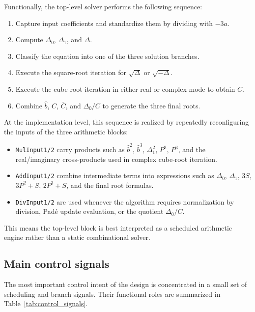 Functionally, the top-level solver performs the following sequence:
\begin{enumerate}
    \item Capture input coefficients and standardize them by dividing with $-3a$.
    \item Compute $\Delta_0$, $\Delta_1$, and $\Delta$.
    \item Classify the equation into one of the three solution branches.
    \item Execute the square-root iteration for $\sqrt{\Delta}$ or $\sqrt{-\Delta}$.
    \item Execute the cube-root iteration in either real or complex mode to obtain $C$.
    \item Combine $\hat{b}$, $C$, $\overline{C}$, and $\Delta_0/C$ to generate the three final roots.
\end{enumerate}

At the implementation level, this sequence is realized by repeatedly reconfiguring the inputs of the three arithmetic blocks:
\begin{itemize}[noitemsep]
    \item \texttt{MulInput1/2} carry products such as $\hat{b}^2$, $\hat{b}^3$, $\Delta_1^2$, $P^2$, $P^3$, and the real/imaginary cross-products used in complex cube-root iteration.
    \item \texttt{AddInput1/2} combine intermediate terms into expressions such as $\Delta_0$, $\Delta_1$, $3S$, $3P^2+S$, $2P^3+S$, and the final root formulas.
    \item \texttt{DivInput1/2} are used whenever the algorithm requires normalization by division, Pad\'e update evaluation, or the quotient $\Delta_0/C$.
\end{itemize}

This means the top-level block is best interpreted as a scheduled arithmetic engine rather than a static combinational solver.

\subsection{Main control signals}

The most important control intent of the design is concentrated in a small set of scheduling and branch signals. Their functional roles are summarized in Table~\ref{tab:control_signals}.

